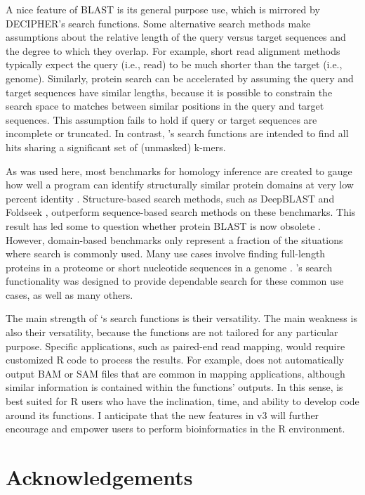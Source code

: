 A nice feature of BLAST is its general purpose use, which is mirrored by DECIPHER's search functions. Some alternative search methods make assumptions about the relative length of the query versus target sequences and the degree to which they overlap. For example, short read alignment methods typically expect the query (i.e., read) to be much shorter than the target (i.e., genome). Similarly, protein search can be accelerated by assuming the query and target sequences have similar lengths, because it is possible to constrain the search space to matches between similar positions in the query and target sequences. This assumption fails to hold if query or target sequences are incomplete or truncated. In contrast, 's search functions are intended to find all hits sharing a significant set of (unmasked) k-mers.

As was used here, most benchmarks for homology inference are created to gauge how well a program can identify structurally similar protein domains at very low percent identity \citep{RN4242}. Structure-based search methods, such as DeepBLAST \citep{RN4244} and Foldseek \citep{RN4226}, outperform sequence-based search methods on these benchmarks. This result has led some to question whether protein BLAST is now obsolete \citep{RN4227}. However, domain-based benchmarks only represent a fraction of the situations where search is commonly used. Many use cases involve finding full-length proteins in a proteome \citep{RN4232} or short nucleotide sequences in a genome \citep{RN4236}. 's search functionality was designed to provide dependable search for these common use cases, as well as many others.

The main strength of `s search functions is their versatility. The main weakness is also their versatility, because the functions are not tailored for any particular purpose. Specific applications, such as paired-end read mapping, would require customized R code to process the results. For example,  does not automatically output BAM or SAM files that are common in mapping applications, although similar information is contained within the functions' outputs. In this sense,  is best suited for R users who have the inclination, time, and ability to develop code around its functions. I anticipate that the new features in  v3 will further encourage and empower users to perform bioinformatics in the R environment.

\section{Acknowledgements}\label{acknowledgements}

